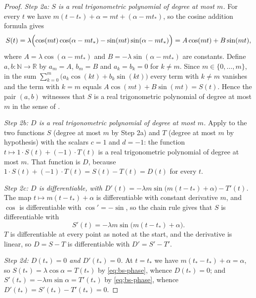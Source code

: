 \begin{proof}
\emph{Step 2a: $S$ is a real trigonometric polynomial of degree at most $m$.}
For every $t$ we have $m(t-t_*)+\alpha=mt+(\alpha-mt_*)$, so the cosine
addition formula gives
\[
  S(t)=\lambda\Bigl(\cos(mt)\cos(\alpha-mt_*)-\sin(mt)\sin(\alpha-mt_*)\Bigr)
      =A\cos(mt)+B\sin(mt),
\]
where $A=\lambda\cos(\alpha-mt_*)$ and $B=-\lambda\sin(\alpha-mt_*)$ are
constants. Define $a,b:\mathbb{N}\to\mathbb{R}$ by $a_m=A$, $b_m=B$ and
$a_k=b_k=0$ for $k\ne m$. Since $m\in\{0,\dots,m\}$, in the sum
$\sum_{k=0}^{m}\bigl(a_k\cos(kt)+b_k\sin(kt)\bigr)$ every term with $k\ne m$
vanishes and the term with $k=m$ equals $A\cos(mt)+B\sin(mt)=S(t)$. Hence the
pair $(a,b)$ witnesses that $S$ is a real trigonometric polynomial of degree at
most $m$ in the sense of .

\emph{Step 2b: $D$ is a real trigonometric polynomial of degree at most $m$.}
Apply  to the two functions $S$ (degree at most $m$ by
Step 2a) and $T$ (degree at most $m$ by hypothesis) with the scalars $c=1$ and
$d=-1$: the function $t\mapsto 1\cdot S(t)+(-1)\cdot T(t)$ is a real
trigonometric polynomial of degree at most $m$. That function is $D$, because
$1\cdot S(t)+(-1)\cdot T(t)=S(t)-T(t)=D(t)$ for every $t$.

\emph{Step 2c: $D$ is differentiable, with
$D'(t)=-\lambda m\sin\bigl(m(t-t_*)+\alpha\bigr)-T'(t)$.} The map
$t\mapsto m(t-t_*)+\alpha$ is differentiable with constant derivative $m$, and
$\cos$ is differentiable with $\cos'=-\sin$, so the chain rule gives that $S$ is
differentiable with
\[
  S'(t)=-\lambda m\sin\bigl(m(t-t_*)+\alpha\bigr).
\]
$T$ is differentiable at every point as noted at the start, and the derivative is
linear, so $D=S-T$ is differentiable with $D'=S'-T'$.

\emph{Step 2d: $D(t_*)=0$ and $D'(t_*)=0$.} At $t=t_*$ we have
$m(t_*-t_*)+\alpha=\alpha$, so $S(t_*)=\lambda\cos\alpha=T(t_*)$ by
\eqref{eq:bs-phase}, whence $D(t_*)=0$; and
$S'(t_*)=-\lambda m\sin\alpha=T'(t_*)$ by \eqref{eq:bs-phase}, whence
$D'(t_*)=S'(t_*)-T'(t_*)=0$.


\end{proof}
